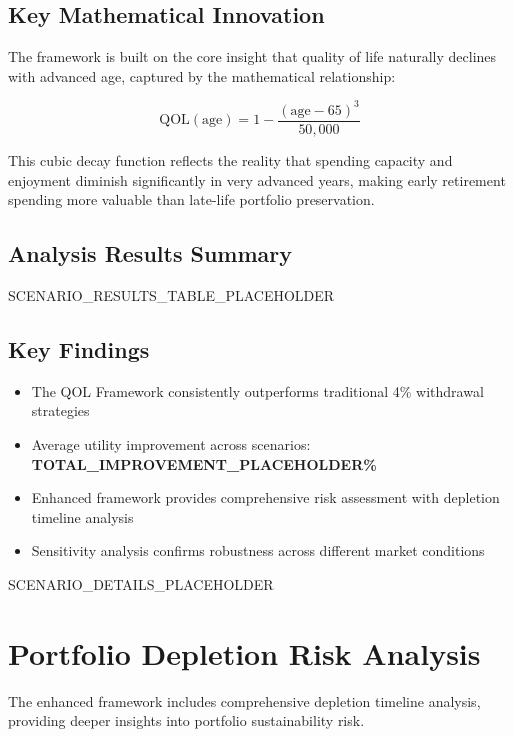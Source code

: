 \documentclass[11pt,a4paper]{article}
\newcommand{\totalimprovement}{TOTAL_IMPROVEMENT_PLACEHOLDER}
\begin{document}
\subsection{Key Mathematical Innovation}
The framework is built on the core insight that quality of life naturally declines with advanced age, captured by the mathematical relationship:

\begin{equation}
    \text{QOL}(\text{age}) = 1 - \frac{(\text{age} - 65)^3}{50,000}
\end{equation}

This cubic decay function reflects the reality that spending capacity and enjoyment diminish significantly in very advanced years, making early retirement spending more valuable than late-life portfolio preservation.

\subsection{Analysis Results Summary}

SCENARIO_RESULTS_TABLE_PLACEHOLDER

\subsection{Key Findings}
\begin{itemize}
    \item The QOL Framework consistently outperforms traditional 4\% withdrawal strategies
    \item Average utility improvement across scenarios: \textbf{\totalimprovement\%}
    \item Enhanced framework provides comprehensive risk assessment with depletion timeline analysis
    \item Sensitivity analysis confirms robustness across different market conditions
\end{itemize}

SCENARIO_DETAILS_PLACEHOLDER

\section{Portfolio Depletion Risk Analysis}

The enhanced framework includes comprehensive depletion timeline analysis, providing deeper insights into portfolio sustainability risk.
\end{document}
